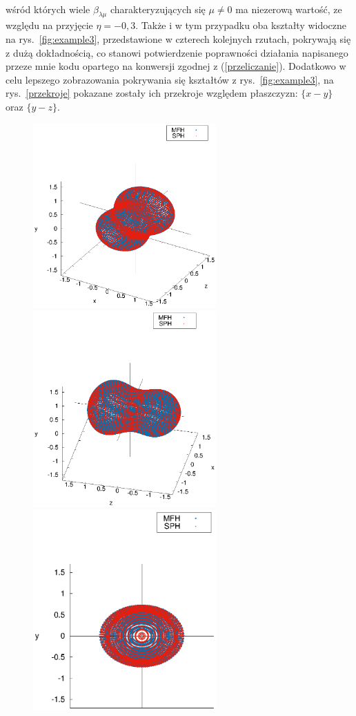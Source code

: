 \documentclass[a4paper,polish,twoside]{article}
\numberwithin{equation}{section}
\begin{document}
\\
wśród których wiele $\beta_{\lambda \mu}$ charakteryzujących się $\mu \neq 0$ ma niezerową wartość, ze względu na przyjęcie $\eta=-0,3$. Także i w tym przypadku oba kształty widoczne na rys.~\ref{fig:example3}, przedstawione w czterech kolejnych rzutach, pokrywają się z dużą dokładnością, co stanowi potwierdzenie poprawności działania napisanego przeze mnie kodu opartego na konwersji zgodnej z (\ref{przeliczanie}). Dodatkowo w celu lepszego zobrazowania pokrywania się kształtów z rys.~\ref{fig:example3}, na rys.~\ref{przekroje} pokazane zostały ich przekroje względem płaszczyzn: $\{x-y\}$ oraz $\{y-z\}$.

\clearpage
\vspace*{\fill}
\begin{figure}[ht!]
    \centering
    \includegraphics[width=7cm]{rys1.eps}    
    \includegraphics[width=7cm]{rys2.eps}\\    
    \vspace{1.5cm}    
    \includegraphics[width=7cm]{rys3.eps}

\end{figure}
\end{document}

